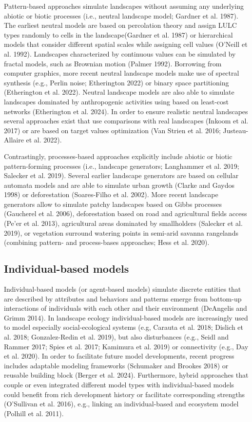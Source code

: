 \documentclass[
  10pt,
  a4paperpaper,
]{article}
\begin{document}
Pattern-based approaches simulate landscapes without assuming any
underlying abiotic or biotic processes (i.e., neutral landscape model;
Gardner et al. 1987). The earliest neutral models are based on
percolation theory and assign LULC types randomly to cells in the
landscape(Gardner et al. 1987) or hierarchical models that consider
different spatial scales while assigning cell values (O'Neill et al.
1992). Landscapes characterized by continuous values can be simulated by
fractal models, such as Brownian motion (Palmer 1992). Borrowing from
computer graphics, more recent neutral landscape models make use of
spectral synthesis (e.g., Perlin noise; Etherington 2022) or binary
space partitioning (Etherington et al. 2022). Neutral landscape models
are also able to simulate landscapes dominated by anthropogenic
activities using based on least-cost networks (Etherington et al. 2024).
In order to ensure realistic neutral landscapes several approaches exist
that use comparisons with real landscapes (Inkoom et al. 2017) or are
based on target values optimization (Van Strien et al. 2016;
Justeau-Allaire et al. 2022).

Contrastingly, processes-based approaches explicitly include abiotic or
biotic pattern-forming processes (i.e., landscape generators; Langhammer
et al. 2019; Salecker et al. 2019). Several earlier landscape generators
are based on cellular automata models and are able to simulate urban
growth (Clarke and Gaydos 1998) or deforestation (Soares-Filho et al.
2002). More recent landscape generators allow to simulate patchy
landscapes based on Gibbs processes (Gaucherel et al. 2006),
deforestation based on road and agricultural fields access (Pe'er et al.
2013), agricultural areas dominated by smallholders (Salecker et al.
2019), or vegetation surround watering points in semi-arid savanna
rangelands (combining pattern- and process-bases approaches; Hess et al.
2020).

\subsection{Individual-based models}\label{individual-based-models}

Individual-based models (or agent-based models) simulate discrete
entities that are described by attributes and behaviors and patterns
emerge from bottom-up interactions of individuals with each other and
their environment (DeAngelis and Grimm 2014). In landscape ecology
individual-based models are increasingly used to model especially
social-ecological systems (e.g, Carauta et al. 2018; Dislich et al.
2018; Gonzalez-Redin et al. 2019), but also disturbances (e.g., Seidl
and Rammer 2017; Spies et al. 2017; Kamimura et al. 2019) or
connectivity (e.g., Day et al. 2020). In order to facilitate future
model developments, recent progress includes adaptable modeling
frameworks (Schumaker and Brookes 2018) or reusable building block
(Berger et al. 2024). Furthermore, hybrid approaches that couple or even
integrated different model types with individual-based models could
benefit from rich development history or facilitate corresponding
strengths (O'Sullivan et al. 2016), e.g., linking an individual-based
and ecosystem model (Polhill et al. 2011).
\end{document}
